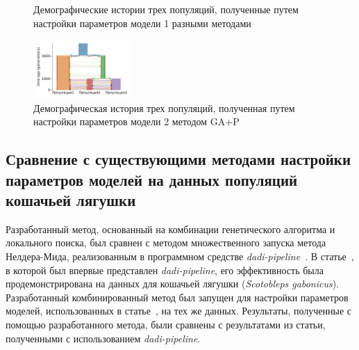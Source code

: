 \begin{figure}[ht!]
\begin{subfigure}[b]{.33\textwidth}
    \caption{}
    \label{fig:part2:experiments:simulated_3:results_model_1_3}
    \end{subfigure}
    \caption{Демографические истории трех популяций, полученные путем настройки параметров модели 1 разными методами}
    \label{fig:part2:experiments:simulated_3:results_model_1}
\end{figure}

\FloatBarrier
\clearpage
\begin{figure}[t!]
    \centering
    \includegraphics[width=0.33\textwidth]{images_experiments/simulation_1/3pop/picture_1pop_model_2_ga_over.pdf}
    \caption{Демографическая история трех популяций, полученная путем настройки параметров модели 2 методом GA+P}
    \label{fig:part2:experiments:simulated_3:results_model_2}
\end{figure}


\subsection{Сравнение с существующими методами настройки параметров моделей на данных популяций кошачьей лягушки}
\label{part2:frogs}

Разработанный метод, основанный на комбинации генетического алгоритма и локального поиска, был сравнен с методом множественного запуска метода Нелдера-Мида, реализованным в программном средстве \textit{dadi-pipeline}~\cite{portik2017evaluating}.
В статье~\cite{portik2017evaluating}, в которой был впервые представлен \textit{dadi-pipeline}, его эффективность была продемонстрирована на данных для кошачьей лягушки (\textit{Scotobleps gabonicus}).
Разработанный комбинированный метод был запущен для настройки параметров моделей, использованных в статье~\cite{portik2017evaluating}, на тех же данных.
Результаты, полученные с помощью разработанного метода, были сравнены с результатами из статьи, полученными с использованием \textit{dadi-pipeline}.

